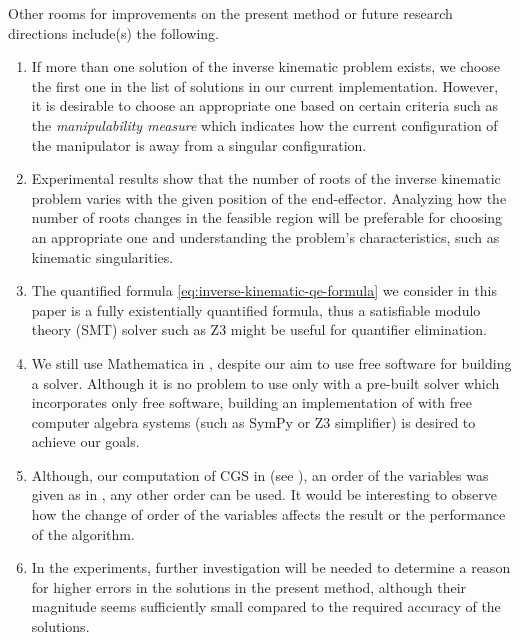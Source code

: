 \documentclass{birkjour}
\theoremstyle{plain}
\theoremstyle{definition}
\begin{document}
    Other rooms for improvements on the present method or 
    future research directions include(s) the following.
    \begin{enumerate}
        \item If more than one solution of the inverse kinematic problem exists,
        we choose the first one in the list of solutions in our current implementation.
        However, it is desirable to choose an appropriate one based on certain criteria such 
        as the \emph{manipulability measure} \cite{sic-sci-vil-ori2008} which indicates how 
        the current configuration of the manipulator is away from a singular configuration.
        \item Experimental results show that the number of roots of the inverse kinematic 
        problem varies with the given position of the end-effector. Analyzing how 
        the number of roots changes in the feasible region will be preferable for choosing
        an appropriate one and understanding the problem's characteristics, such 
        as kinematic singularities.
        \item The quantified formula \eqref{eq:inverse-kinematic-qe-formula} we consider in this paper is 
        a fully existentially quantified formula, thus a satisfiable modulo theory (SMT) solver 
        such as Z3 \cite{mou-nik2008} might be useful for quantifier elimination.
        \item We still use Mathematica in ,
        despite our aim to use free software for building a solver. 
        Although it is no problem to use only  with a pre-built solver 
        which incorporates only free software,
        building an implementation of  with free computer algebra systems (such as SymPy or Z3 simplifier) is desired to achieve our goals.
        \item Although, our computation of CGS in 
        (see ), an order of the variables was given 
        as in , any other order can be used. It would be interesting to 
        observe how the change of order of the variables affects the result or the performance 
        of the algorithm.
        \item In the experiments, further investigation will be needed 
        to determine a reason for higher errors in the 
        solutions in the present method, although their magnitude seems sufficiently small  
        compared to the required accuracy of the solutions.

\end{enumerate}
\end{document}
